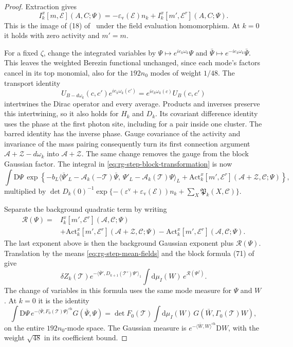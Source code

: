 \documentclass[11pt,letterpaper,reqno]{amsart}
\newcommand{\dd}{\mathrm d}
\newcommand{\exteq}[2]{(#1) of~\cite{#2}}
\begin{document}
\begin{proof}
Extraction gives
\[
 I_k^x[m,\mathscr E](A,C;\Psi)
      =-\varepsilon_{\mathrm v}(\mathscr E)n_k
                                      +I_k^x[m',\mathscr E^r](A,C;\Psi).
\]
This is the image of
\exteq{18}{NormalizedContraction} under the
field evaluation homomorphism. At $k=0$ it holds
with zero activity and $m'=m$.

For a fixed $\zeta$, change the integrated variables
by $\Psi\mapsto e^{ie_k\omega_k}\Psi$ and
$\bar\Psi\mapsto e^{-ie_k\omega_k}\bar\Psi$.
This leaves the weighted Berezin functional unchanged,
since each mode's factors cancel in its top monomial,
also for the $192n_0$ modes of weight $1/48$.
The transport identity
\[
 U_{B-d\omega_k}(c,c')e^{ie_k\omega_k(c')}
                       =e^{ie_k\omega_k(c)}U_B(c,c')
\]
intertwines the Dirac operator and every average.
Products and inverses preserve this intertwining,
so it also holds for $H_k$ and $D_k$.
Its covariant difference identity uses the phase
at the first photon site, including for a pair
inside one cluster. The barred identity has the
inverse phase. Gauge covariance of the activity
and invariance of the mass pairing consequently
turn its first connection argument
$\mathscr A+\mathscr Z-d\omega_k$ into
$\mathscr A+\mathscr Z$.
The same change removes the gauge from the block
Gaussian factor. The integral in
\eqref{eq:rg-step-block-transformation} is now
\[
 \int\mathrm D\Psi\,
       \exp\left\{-b_L
          \langle\bar\Psi'_L-\mathcal A_k(-\mathscr T)\bar\Psi,\,
                  \Psi'_L-\mathcal A_k(\mathscr T)\Psi\rangle_L
            +\mathrm{Act}_k^x[m',\mathscr E^r]
                    (\mathscr A+\mathscr Z,\mathscr C;\Psi)\right\},
\]
multiplied by
$\det D_k(0)^{-1}
\exp\{-(\varepsilon^{\mathrm v}+
\varepsilon_{\mathrm v}(\mathscr E))n_k+
\sum_X\mathfrak P_k(X,\mathscr C)\}$.

Separate the background quadratic term by writing
\[
 \begin{split}
 \mathcal R(\Psi)={}&I_k^x[m',\mathscr E^r](\mathscr A,\mathscr C;\Psi)\\
  &+\mathrm{Act}_k^x[m',\mathscr E^r]
                    (\mathscr A+\mathscr Z,\mathscr C;\Psi)
   -\mathrm{Act}_k^x[m',\mathscr E^r]
                    (\mathscr A,\mathscr C;\Psi).
 \end{split}
\]
The last exponent above is then the background
Gaussian exponent plus $\mathcal R(\Psi)$.
Translation by the means \eqref{eq:rg-step-mean-fields}
and the block formula \exteq{71}{FermionBlockManuscript}
give
\[
 \delta Z_k(\mathscr T)
   e^{-\langle\bar\Psi',D_{k+1}(\mathscr T')\Psi'\rangle_1}
          \int\dd\mu_I(W)\,e^{\mathcal R(\Psi^f)}.
\]
The change of variables in this formula uses the
same mode measure for $\Psi$ and $W$.
At $k=0$ it is the identity
\[
 \int\mathrm D\Psi\,e^{-\langle\bar\Psi,F_0(\mathscr T)\Psi\rangle^{\mathrm{ch}}}
       G(\bar\Psi,\Psi)
   =\det F_0(\mathscr T)
          \int\dd\mu_I(W)\,
                    G(\bar W,\Gamma_0(\mathscr T)W),
\]
on the entire $192n_0$-mode space.
The Gaussian measure is
$e^{-\langle\bar W,W\rangle^{\mathrm{ch}}}\mathrm DW$,
with the weight $\sqrt{48}$ in its coefficient bound.


\end{proof}
\end{document}

